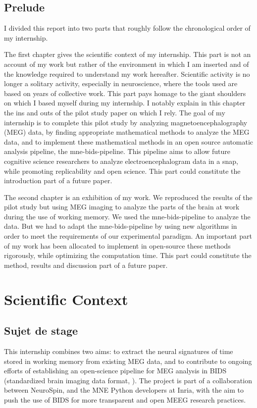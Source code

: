 \section*{Prelude}

I divided this report into two parts that roughly follow the chronological order of my internship.

The first chapter gives the scientific context of my internship. This part is not an account of my work but rather of the environment in which I am inserted and of the knowledge required to understand my work hereafter. Scientific activity is no longer a solitary activity, especially in neuroscience, where the tools used are based on years of collective work. This part pays homage to the giant shoulders on which I based myself during my internship. I notably explain in this chapter the ins and outs of the pilot study paper \cite{herbst2021abstracting} on which I rely. The goal of my internship is to complete this pilot study by analyzing magnetoencephalography (MEG) data, by finding appropriate mathematical methods to analyze the MEG data, and to implement these mathematical methods in an open source automatic analysis pipeline, the mne-bids-pipeline. This pipeline aims to allow future cognitive science researchers to analyze electroencephalogram data in a snap, while promoting replicability and open science. This part could constitute the introduction part of a future paper.

The second chapter is an exhibition of my work. We reproduced the results of the pilot study but using MEG imaging to analyze the parts of the brain at work during the use of working memory. We used the mne-bids-pipeline to analyze the data. But we had to adapt the mne-bids-pipeline by using new algorithms in order to meet the requirements of our experimental paradigm. An important part of my work has been allocated to implement in open-source these methods rigorously, while optimizing the computation time. This part could constitute the method, results and discussion part of a future paper.

\chapter{Scientific Context}

\section{Sujet de stage}
This internship combines two aims: to extract the neural signatures of time stored
in working memory from existing MEG data, and to contribute to ongoing efforts of
establishing an open-science pipeline for MEG analysis in BIDS (standardized brain imaging
data format, \cite{gorgolewski2016brain}). The project is part of a collaboration between NeuroSpin, and the MNE
Python developers at Inria, with the aim to push the use of BIDS for
more transparent and open MEEG research practices.

